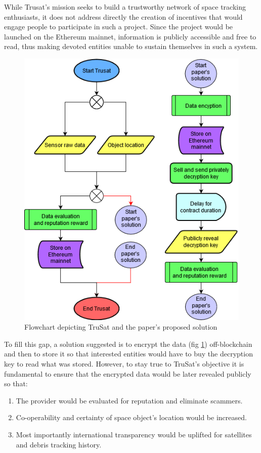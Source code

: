 \documentclass[conference]{IEEEtran}
\begin{document}
While Trusat's mission seeks to build a trustworthy network of space tracking enthusiasts, it does not address directly the creation of incentives that would engage people to participate in such a project. Since the project would be launched on the Ethereum mainnet, information is publicly accessible and free to read, thus making devoted entities unable to sustain themselves in such a system.

\begin{figure}[htp]
\centering
\includegraphics[width=\linewidth]{TruSat and paper.png}
 \caption{Flowchart depicting TruSat and the paper's proposed solution}
 \label{fig:TruSat and paper}
\end{figure}

To fill this gap, a solution suggested is to encrypt the data (fig \ref{fig:TruSat and paper}) off-blockchain and then to store it so that interested entities would have to buy the decryption key to read what was stored. However, to stay true to TruSat's objective it is fundamental to ensure that the encrypted data would be later revealed publicly so that:
\begin{enumerate}
  \item The provider would be evaluated for reputation and eliminate scammers.
  \item Co-operability and certainty of space object's location would be increased.
  \item Most importantly international transparency would be uplifted for satellites and debris tracking history.
\end{enumerate}
 
\end{document}
